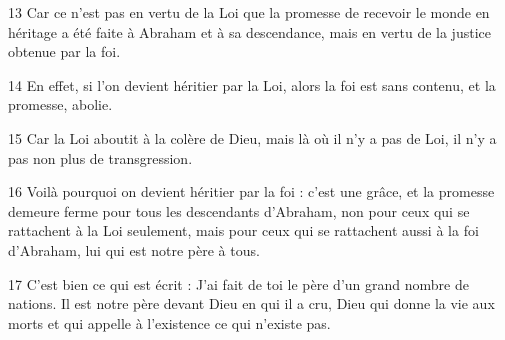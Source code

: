 
13 Car ce n’est pas en vertu de la Loi que la promesse de recevoir le monde en héritage a été faite à Abraham et à sa descendance, mais en vertu de la justice obtenue par la foi.

14 En effet, si l’on devient héritier par la Loi, alors la foi est sans contenu, et la promesse, abolie.

15 Car la Loi aboutit à la colère de Dieu, mais là où il n’y a pas de Loi, il n’y a pas non plus de transgression.

16 Voilà pourquoi on devient héritier par la foi : c’est une grâce, et la promesse demeure ferme pour tous les descendants d’Abraham, non pour ceux qui se rattachent à la Loi seulement, mais pour ceux qui se rattachent aussi à la foi d’Abraham, lui qui est notre père à tous.

17 C’est bien ce qui est écrit : J’ai fait de toi le père d’un grand nombre de nations. Il est notre père devant Dieu en qui il a cru, Dieu qui donne la vie aux morts et qui appelle à l’existence ce qui n’existe pas.